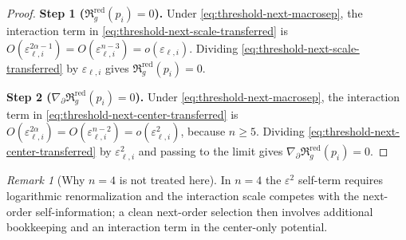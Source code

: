 \documentclass[11pt,reqno,a4paper]{amsart}
\numberwithin{equation}{section}
\theoremstyle{plain}
\theoremstyle{remark}
\newtheorem{remark}[theorem]{Remark}
\theoremstyle{plain}
\begin{document}
\begin{proof}
\smallskip\noindent\textbf{Step 1 ($\mathfrak R_g^{\mathrm{red}}(p_i)=0$).}
Under \eqref{eq:threshold-next-macrosep}, the interaction term in
\eqref{eq:threshold-next-scale-transferred} is
$O(\varepsilon_{\ell,i}^{2\alpha-1})=O(\varepsilon_{\ell,i}^{n-3})=o(\varepsilon_{\ell,i})$.
Dividing \eqref{eq:threshold-next-scale-transferred} by $\varepsilon_{\ell,i}$ gives
$\mathfrak R_g^{\mathrm{red}}(p_i)=0$.

\smallskip\noindent\textbf{Step 2 ($\nabla_\partial\mathfrak R_g^{\mathrm{red}}(p_i)=0$).}
Under \eqref{eq:threshold-next-macrosep}, the interaction term in
\eqref{eq:threshold-next-center-transferred} is
$O(\varepsilon_{\ell,i}^{2\alpha})=O(\varepsilon_{\ell,i}^{n-2})=o(\varepsilon_{\ell,i}^2)$, because
$n\ge5$.  Dividing \eqref{eq:threshold-next-center-transferred} by $\varepsilon_{\ell,i}^2$ and passing to the
limit gives $\nabla_\partial\mathfrak R_g^{\mathrm{red}}(p_i)=0$.
\end{proof}

\begin{remark}[Why $n=4$ is not treated here]\label{rem:n4-not-treated}
In $n=4$ the $\varepsilon^2$ self-term requires logarithmic renormalization and the interaction scale competes
with the next-order self-information; a clean next-order selection then involves additional bookkeeping and an
interaction term in the center-only potential.
\end{remark}
\end{document}
